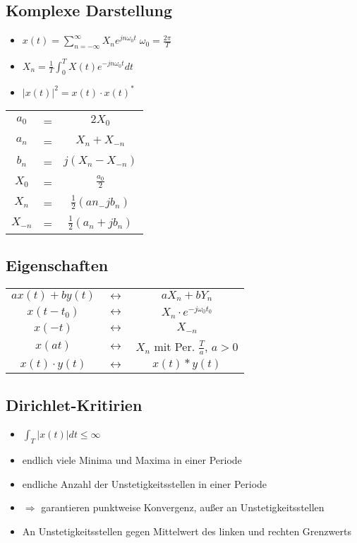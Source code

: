 \documentclass{article}
\begin{document}
\subsection{Komplexe Darstellung}
\begin{itemize}
\item $x(t) = \sum_{n = - \infty}^\infty X_ne^{jn\omega_0t} \; \omega_0 = \frac{2\pi}{T}$
\item $X_n = \frac{1}{T} \int_0^T X(t) e^{-jn\omega_0t}dt$
\item $|x(t)|^2 = x(t)\cdot x(t)^*$
\end{itemize}
\begin{tabular}{c  c c}
$a_0$ &=& $2X_0$ \\
 $a_n$&= & $X_n +X_{-n}$ \\
 $b_n$&= & $j(X_n-X_{-n})$ \\
 $X_0$&= & $\frac{a_0}{2}$ \\
 $X_n$ &=& $\frac{1}{2}(an_-jb_n)$ \\
 $X_{-n}$ &=& $\frac{1}{2}(a_n+jb_n)$ \\
 \end{tabular}


\subsection{Eigenschaften}
\begin{tabular}{c c c}
$ax(t) + by(t)$ &$\leftrightarrow$& $aX_n+bY_n$ \\
$x(t-t_0)$ &$\leftrightarrow$& $X_n\cdot e^{-j\omega_0t_0}$ \\
$x(-t)$ &$\leftrightarrow$& $X_{-n}$ \\
$x(at)$ &$\leftrightarrow$& $X_n$ mit Per. $\frac{T}{a}$, $a > 0$ \\
$x(t)\cdot y(t)$ &$\leftrightarrow$& $x(t)*y(t)$ \\
\end{tabular}

\subsection{Dirichlet-Kritirien}
\begin{itemize}
\item $\int_T |x(t)|dt \leq \infty$
\item endlich viele Minima und Maxima in einer Periode
\item endliche Anzahl der Unstetigkeitsstellen in einer Periode
\item $\Rightarrow$ garantieren punktweise Konvergenz, außer an Unstetigkeitsstellen
\item An Unstetigkeitsstellen gegen Mittelwert des linken und rechten Grenzwerts
\end{itemize}
\end{document}

